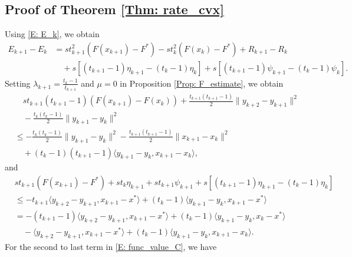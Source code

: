 \documentclass[pdflatex,sn-mathphys-num]{sn-jnl}
\theoremstyle{thmstyleone}
\theoremstyle{thmstyletwo}
\theoremstyle{thmstylethree}
\begin{document}
\subsection{Proof of Theorem \ref{Thm: rate_cvx}}
Using \eqref{E: E_k}, we obtain
\begin{equation}\label{E: E_k_diff}
\begin{aligned}
E_{k+1} - E_k 
&= st_{k+1}^2 \left( F(x_{k+1}) - F^* \right)
  -st_k^2 \left( F(x_k) - F^* \right) 
  + R_{k+1}-R_k\\
&\quad + s[ (t_{k+1}-1)\eta_{k+1} - (t_k-1)\eta_k ]
  + s[ (t_{k+1}-1)\psi_{k+1} - (t_k-1)\psi_k].  
\end{aligned}
\end{equation} 
Setting $\lambda_{k+1} = \frac{t_k-1}{t_{k+1}}$ and $\mu=0$ in Proposition \ref{Prop: F_estimate}, we obtain
\begin{equation}\label{E: func_gap_C}
\begin{aligned}
&\quad st_{k+1}(t_{k+1}-1) \left( F(x_{k+1}) - F(x_k) \right) + \frac{t_{k+1}(t_{k+1}-1)}{2}\| y_{k+2} - y_{k+1} \|^2 \\
&\quad - \frac{t_k(t_k-1)}{2}\| y_{k+1} - y_k \|^2 \\ 
&\le - \frac{t_k(t_k-1)}{2}\| y_{k+1} - y_k \|^2
     - \frac{t_{k+1}(t_{k+1}-1)}{2}\| x_{k+1} - x_k \|^2 \\
&\quad  + (t_k-1)(t_{k+1}-1) \langle y_{k+1}-y_k, x_{k+1} - x_k \rangle, 
 \end{aligned}
\end{equation}  
and
\begin{equation}\label{E: func_value_C}
\begin{aligned}
& st_{k+1}\left( F(x_{k+1}) - F^* \right) + st_k\eta_{k+1} 
  + st_{k+1}\psi_{k+1} 
  + s[ (t_{k+1}-1)\eta_{k+1} - (t_k-1)\eta_k ] \\
&\le - t_{k+1}\langle y_{k+2}-y_{k+1}, x_{k+1}-x^* \rangle 
     + (t_k-1)\langle y_{k+1}-y_k, x_{k+1}-x^* \rangle \\
&= - (t_{k+1}-1)\langle y_{k+2}-y_{k+1}, x_{k+1}-x^* \rangle 
   + (t_k-1)\langle y_{k+1}-y_k, x_k-x^* \rangle \\
&\quad - \langle y_{k+2}-y_{k+1}, x_{k+1}-x^* \rangle
     + (t_k-1)\langle y_{k+1}-y_k, x_{k+1}-x_k \rangle.    
\end{aligned}
\end{equation}
For the second to last term in \eqref{E: func_value_C}, we have
\end{document}
